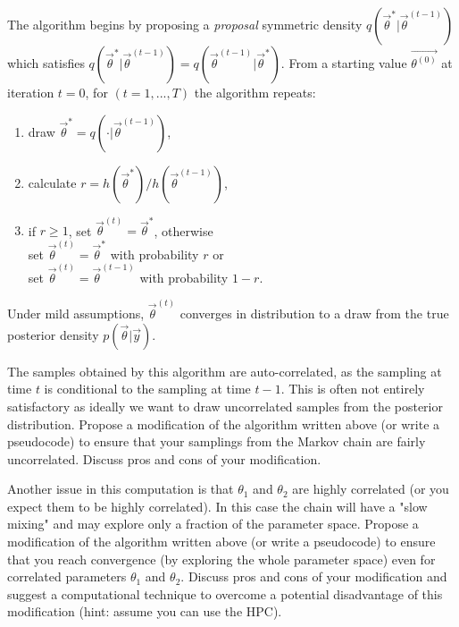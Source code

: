         The algorithm begins by proposing a \textit{proposal} symmetric density
        $q(\vec{\theta}^* | \vec{\theta}^{(t-1)})$ which satisfies
        $q(\vec{\theta}^* | \vec{\theta}^{(t-1)})=q(\vec{\theta}^{(t-1)} | \vec{\theta}^*)$.
        From a starting value $\vec{\theta^{(0)}}$ at iteration $t=0$, for $(t=1,..., T)$
        the algorithm repeats:
        \begin{enumerate}
                \item draw $\vec{\theta}^* = q( \cdot | \vec{\theta}^{(t-1)})$,
                \item calculate $r=h(\vec{\theta}^*)/h(\vec{\theta}^{(t-1)})$,
                \item if $r \geq 1$, set $\vec{\theta}^{(t)}=\vec{\theta}^*$, otherwise\\
                        set $\vec{\theta}^{(t)}=\vec{\theta}^*$ with probability $r$ or\\
                        set $\vec{\theta}^{(t)}=\vec{\theta}^{(t-1)}$ with probability $1-r$.
        \end{enumerate}
        Under mild assumptions, $\vec{\theta}^{(t)}$ converges in distribution to a draw
        from the true posterior density $p(\vec{\theta}|\vec{y})$.

        The samples obtained by this algorithm are auto-correlated, as the sampling at time $t$
        is conditional to the sampling at time $t-1$.
        This is often not entirely satisfactory as ideally we want to draw uncorrelated samples from the
        posterior distribution.
        Propose a modification of the algorithm written above (or write a pseudocode) to ensure that your
        samplings from the Markov chain are fairly uncorrelated.
        Discuss pros and cons of your modification.

 	Another issue in this computation is that $\theta_1$ and $\theta_2$ are highly correlated (or
        you expect them to be highly correlated).
        In this case the chain will have a "slow mixing" and may explore only a fraction of the parameter
        space.
        Propose a modification of the algorithm written above (or write a pseudocode) to ensure that
        you reach convergence (by exploring the whole parameter space) even for correlated parameters
        $\theta_1$ and $\theta_2$.
        Discuss pros and cons of your modification and suggest a computational technique to overcome
        a potential disadvantage of this modification (hint: assume you can use the HPC).








